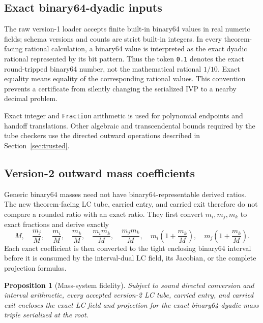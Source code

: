 \documentclass[11pt]{article}
\newtheorem{proposition}[theorem]{Proposition}
\begin{document}
\subsection{Exact binary64-dyadic inputs}

The raw version-1 loader accepts finite built-in binary64 values in real
numeric fields; schema versions and counts are strict built-in integers.  In
every theorem-facing rational calculation, a binary64 value is interpreted
as the exact dyadic rational represented by its bit pattern.  Thus the token
\texttt{0.1} denotes the exact round-tripped binary64 number, not the
mathematical rational $1/10$.  Exact equality means equality of the
corresponding rational values.  This convention prevents a certificate from
silently changing the serialized IVP to a nearby decimal problem.

Exact integer and \texttt{Fraction} arithmetic is used for polynomial
endpoints and handoff translations.  Other algebraic and transcendental
bounds required by the tube checkers use the directed outward operations
described in Section~\ref{sec:trusted}.

\subsection{Version-2 outward mass coefficients}

Generic binary64 masses need not have binary64-representable derived ratios.
The new theorem-facing LC tube, carried entry, and carried exit therefore do
not compare a rounded ratio with an exact ratio.  They first convert
$m_i,m_j,m_k$ to exact fractions and derive exactly
\begin{equation}
 M,\quad \frac{m_j}{M},\quad \frac{m_i}{M},\quad
 \frac{m_k}{M},\quad
 \frac{m_i m_k}{M},\quad \frac{m_j m_k}{M},\quad
 m_i\left(1+\frac{m_k}{M}\right),\quad
 m_j\left(1+\frac{m_k}{M}\right).
 \label{eq:mass-coefficients}
\end{equation}
Each exact coefficient is then converted to the tight enclosing binary64
interval before it is consumed by the interval-dual LC field, its Jacobian,
or the complete projection formulas.

\begin{proposition}[Mass-system fidelity]
\label{prop:masses}
Subject to sound directed conversion and interval arithmetic, every accepted
version-2 LC tube, carried entry, and carried exit encloses the exact LC field
and projection for the exact binary64-dyadic mass triple serialized at the
root.
\end{proposition}
\end{document}
